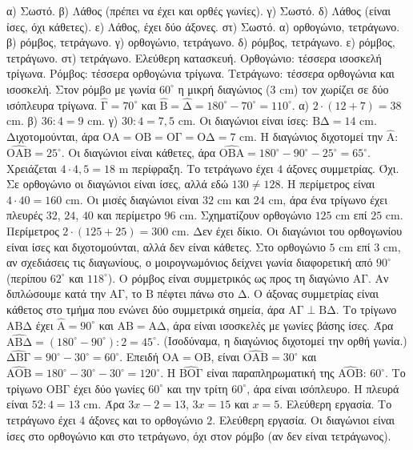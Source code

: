  α) Σωστό. β) Λάθος (πρέπει να έχει και ορθές γωνίες). γ) Σωστό. δ) Λάθος (είναι ίσες, όχι κάθετες). ε) Λάθος, έχει δύο άξονες. στ) Σωστό.
 α) ορθογώνιο, τετράγωνο. β) ρόμβος, τετράγωνο. γ) ορθογώνιο, τετράγωνο. δ) ρόμβος, τετράγωνο. ε) ρόμβος, τετράγωνο. στ) τετράγωνο.
 Ελεύθερη κατασκευή. Ορθογώνιο: τέσσερα ισοσκελή τρίγωνα. Ρόμβος: τέσσερα ορθογώνια τρίγωνα. Τετράγωνο: τέσσερα ορθογώνια και ισοσκελή. Στον ρόμβο με γωνία $60^\circ$ η μικρή διαγώνιος ($3$ cm) τον χωρίζει σε δύο ισόπλευρα τρίγωνα.
 $\hat{\mathrm{Γ}}=70^\circ$ και $\hat{\mathrm{Β}}=\hat{\mathrm{Δ}}=180^\circ-70^\circ=110^\circ$.
 α) $2\cdot(12+7)=38$ cm. β) $36:4=9$ cm. γ) $30:4=7{,}5$ cm.
 Οι διαγώνιοι είναι ίσες: $\mathrm{ΒΔ}=14$ cm. Διχοτομούνται, άρα $\mathrm{ΟΑ}=\mathrm{ΟΒ}=\mathrm{ΟΓ}=\mathrm{ΟΔ}=7$ cm.
 Η διαγώνιος διχοτομεί την $\hat{\mathrm{Α}}$: $\widehat{\mathrm{ΟΑΒ}}=25^\circ$. Οι διαγώνιοι είναι κάθετες, άρα $\widehat{\mathrm{ΟΒΑ}}=180^\circ-90^\circ-25^\circ=65^\circ$.
 Χρειάζεται $4\cdot4{,}5=18$ m περίφραξη. Το τετράγωνο έχει $4$ άξονες συμμετρίας.
 Όχι. Σε ορθογώνιο οι διαγώνιοι είναι ίσες, αλλά εδώ $130\neq128$.
 Η περίμετρος είναι $4\cdot40=160$ cm. Οι μισές διαγώνιοι είναι $32$ cm και $24$ cm, άρα ένα τρίγωνο έχει πλευρές $32$, $24$, $40$ και περίμετρο $96$ cm.
 Σχηματίζουν ορθογώνιο $125$ cm επί $25$ cm. Περίμετρος $2\cdot(125+25)=300$ cm.
 Δεν έχει δίκιο. Οι διαγώνιοι του ορθογωνίου είναι ίσες και διχοτομούνται, αλλά δεν είναι κάθετες. Στο ορθογώνιο $5$ cm επί $3$ cm, αν σχεδιάσεις τις διαγωνίους, ο μοιρογνωμόνιος δείχνει γωνία διαφορετική από $90^\circ$ (περίπου $62^\circ$ και $118^\circ$).
 Ο ρόμβος είναι συμμετρικός ως προς τη διαγώνιο $\mathrm{ΑΓ}$. Αν διπλώσουμε κατά την $\mathrm{ΑΓ}$, το $\mathrm{Β}$ πέφτει πάνω στο $\mathrm{Δ}$. Ο άξονας συμμετρίας είναι κάθετος στο τμήμα που ενώνει δύο συμμετρικά σημεία, άρα $\mathrm{ΑΓ}\perp\mathrm{ΒΔ}$.
 Το τρίγωνο $\mathrm{ΑΒΔ}$ έχει $\hat{\mathrm{Α}}=90^\circ$ και $\mathrm{ΑΒ}=\mathrm{ΑΔ}$, άρα είναι ισοσκελές με γωνίες βάσης ίσες. Άρα $\widehat{\mathrm{ΑΒΔ}}=(180^\circ-90^\circ):2=45^\circ$. (Ισοδύναμα, η διαγώνιος διχοτομεί την ορθή γωνία.)
 $\widehat{\mathrm{ΔΒΓ}}=90^\circ-30^\circ=60^\circ$. Επειδή $\mathrm{ΟΑ}=\mathrm{ΟΒ}$, είναι $\widehat{\mathrm{ΟΑΒ}}=30^\circ$ και $\widehat{\mathrm{ΑΟΒ}}=180^\circ-30^\circ-30^\circ=120^\circ$. Η $\widehat{\mathrm{ΒΟΓ}}$ είναι παραπληρωματική της $\widehat{\mathrm{ΑΟΒ}}$: $60^\circ$. Το τρίγωνο $\mathrm{ΟΒΓ}$ έχει δύο γωνίες $60^\circ$ και την τρίτη $60^\circ$, άρα είναι ισόπλευρο.
 Η πλευρά είναι $52:4=13$ cm. Άρα $3x-2=13$, $3x=15$ και $x=5$.
 Ελεύθερη εργασία. Το τετράγωνο έχει $4$ άξονες και το ορθογώνιο $2$.
 Ελεύθερη εργασία. Οι διαγώνιοι είναι ίσες στο ορθογώνιο και στο τετράγωνο, όχι στον ρόμβο (αν δεν είναι τετράγωνος).

